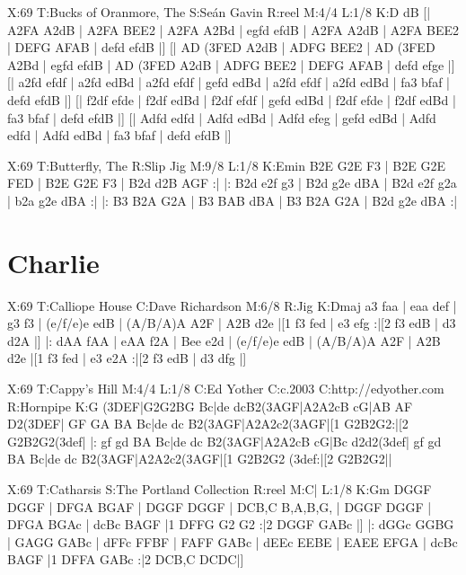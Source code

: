 \documentclass[letterpaper]{article}
\begin{document}
\begin{abc}[name]
X:69
T:Bucks of Oranmore, The
S:Seán Gavin
R:reel
M:4/4
L:1/8
K:D
dB [| A2FA A2dB | A2FA BEE2 | A2FA A2Bd | egfd efdB |
A2FA A2dB | A2FA BEE2 | DEFG AFAB | defd efdB |]
[| AD (3FED A2dB | ADFG  BEE2 | AD (3FED A2Bd | egfd efdB |
AD (3FED A2dB | ADFG  BEE2 | DEFG AFAB | defd efge |]
[| a2fd efdf | a2fd edBd | a2fd efdf | gefd edBd |
a2fd efdf | a2fd edBd | fa3 bfaf | defd efdB |]
[| f2df efde | f2df edBd | f2df efdf | gefd edBd |
f2df efde | f2df edBd | fa3 bfaf | defd efdB |] 
[| Adfd edfd | Adfd edBd | Adfd efeg | gefd edBd |
Adfd edfd | Adfd edBd | fa3 bfaf | defd efdB |] 
\end{abc}

\begin{abc}[name]
X:69
T:Butterfly, The
R:Slip Jig
M:9/8
L:1/8
K:Emin
B2E G2E F3 | B2E G2E FED | B2E G2E F3 | B2d d2B AGF :|
|: B2d e2f g3 | B2d g2e dBA | B2d e2f g2a | b2a g2e dBA :|
|: B3 B2A G2A | B3 BAB dBA | B3 B2A G2A | B2d g2e dBA :|
\end{abc}

\section{Charlie}
\begin{abc}[name]
X:69
T:Calliope House
C:Dave Richardson
M:6/8
R:Jig
K:Dmaj
a3 faa | eaa def | g3 f3 | (e/f/e)e edB |
(A/B/A)A A2F | A2B d2e |[1 f3 fed | e3 efg :|[2 f3 edB | d3 d2A |]
|: dAA fAA | eAA f2A | Bee e2d | (e/f/e)e edB | (A/B/A)A A2F |
A2B d2e |[1 f3 fed | e3 e2A :|[2 f3 edB | d3 dfg |]
\end{abc}

\begin{abc}[name]
X:69
T:Cappy's Hill
M:4/4
L:1/8
C:Ed Yother
C:c.2003
C:http://edyother.com
R:Hornpipe
K:G
(3DEF|G2G2BG Bc|de dcB2(3AGF|A2A2cB cG|AB AF D2(3DEF|
GF GA BA Bc|de dc B2(3AGF|A2A2c2(3AGF|[1 G2B2G2:|[2 G2B2G2(3def|
|: gf gd BA Bc|de dc B2(3AGF|A2A2cB cG|Bc d2d2(3def|
gf gd BA Bc|de dc B2(3AGF|A2A2c2(3AGF|[1 G2B2G2 (3def:|[2 G2B2G2||
\end{abc}

\begin{abc}[name]
X:69
T:Catharsis
S:The Portland Collection
R:reel
M:C|
L:1/8
K:Gm
DGGF DGGF | DFGA BGAF | DGGF DGGF | DCB,C B,A,B,G, |
DGGF DGGF | DFGA BGAc | dcBc BAGF |1 DFFG G2 G2 :|2 DGGF GABc |]
|: dGGc GGBG | GAGG GABc | dFFc FFBF | FAFF GABc |
dEEc EEBE | EAEE EFGA | dcBc BAGF |1 DFFA GABc :|2 DCB,C DCDC|]
\end{abc}
\end{document}
